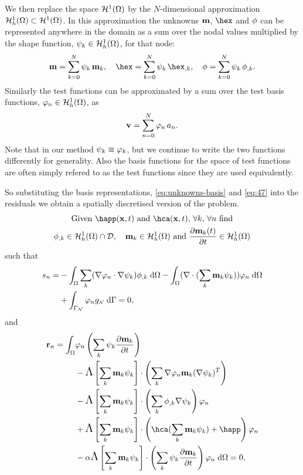 We then replace the space $\mathcal{H}^1(\Omega)$ by the $N$-dimensional approximation ${\mathcal{H}^1_h(\Omega)} \subset \mathcal{H}^1(\Omega)$. In this approximation the unknowns $\mathbf{m}$, $\hex$ and $\phi$ can be represented anywhere in the domain as a sum over the nodal values multiplied by the shape function, ${\psi_k} \in {\mathcal{H}^1_h(\Omega)}$, for that node:
\begin{gather} %
  \mv = \sum_{k = 0}^{N} \sk \, \mv_k, \quad
  \hex = \sum_{k = 0}^{N} \sk \, \hex_{,k}, \quad
  \phim = \sum_{k = 0}^{N} \sk \, \phim_{,k}.
  \label{eq:unknowns-basis}
\end{gather}
Similarly the test functions can be approximated by a sum over the test basis functions, ${\varphi_n} \in {\mathcal{H}^1_h(\Omega)}$, as
\begin{equation}
  \label{eq:47}
  \mathbf{v} = \sum_{n = 0}^{N} {\varphi_n} \, a_n.
\end{equation}
Note that in our method $\psi_k \equiv \varphi_k$, but we continue to write the two functions differently for generality. Also the basis functions for the space of test functions are often simply refered to as the test functions since they are used equivalently.

So substituting the basis representations, \eqref{eq:unknowns-basis} and \eqref{eq:47} into the residuals we obtain a spatially discretised version of the problem.
\begin{gather}
  \label{res:tintro}
  \text{Given $\happ(\xv,t)$ and $\hca(\xv,t)$, $\forall k$, $\forall \ndi$ find} \notag \\
  \phim_{,k} \in \ts \cap \Dfs, \quad
  \mv_{k} \in \ts \text{ and }
  \pd{\mv_k(t)}{t} \in \ts \notag
\end{gather}
such that
\begin{align}
  s_n =
  & - \int_{\Omega} \sum_k (\nabla {\varphi_n} \cdot \nabla {\psi_k}) \phi_{,k} {\; \text{d}} \Omega \notag
  - \int_{\Omega} (\nabla \cdot (\sum_k \mathbf{m}_k {\psi_k}) ) {\varphi_n} {\; \text{d}} \Omega \\
  & + \int_{{\Gamma}_{{\scriptscriptstyle{\mathcal{N}}}}} {\varphi_n} g_{\scriptscriptstyle{\mathcal{N}}} {\; \text{d}} {\Gamma} = 0,
  \label{res:tphi}
\end{align}
and
\begin{align*}
  \rllg_\ndi =
  \int_{\magd} &\tn \left(\sum_k \sk \pd{\mv_k}{t} \right)
  \\
  &- \crossop{\sum_k \mv_k \sk}{\sum_k \nabla \tn \mv_k (\nabla \sk)^T}
  \\
  &- \crossop{\sum_k \mv_k \sk}{\sum_k \phim_{,k} \nabla \sk} \tn
  \\
  &+ \crossop{\sum_k \mv_k \sk}{\hca(\sum_k \mv_k \sk) + \happ} \tn
  \\
  &- \dampc \crossop{\sum_k \mv_k \sk} {\sum_k \sk \pd{\mv_k}{t}} \tn \d \magd = 0,
\end{align*}


